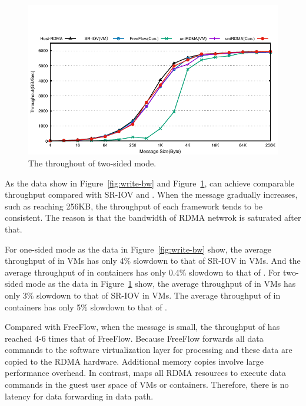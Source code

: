 \begin{figure}[!ht]
	\centering
	\includegraphics[width=1.00\linewidth]{images/send-bw.pdf}
	\caption{The throughout of two-sided mode.}
	\label{fig:send-bw}
\end{figure}


As the data show in Figure~\ref{fig:write-bw} and Figure~\ref{fig:send-bw}, \sys can achieve comparable throughput compared with SR-IOV and \native. When the message gradually increases, such as reaching 256KB, the throughput of each framework tends to be consistent. The reason is that the bandwidth of RDMA netwrok is saturated after that. %

For one-sided mode as the data in Figure~\ref{fig:write-bw} show, the average throughput of \sys in VMs has only 4$\%$ slowdown to that of SR-IOV in VMs. And the average throughput of \sys in containers has only 0.4$\%$ slowdown to that of \native. For two-sided mode as the data in Figure~\ref{fig:send-bw} show, the average throughput of \sys in VMs has only 3$\%$ slowdown to that of SR-IOV in VMs. The average throughput of \sys in containers has only 5$\%$ slowdown to that of \native.




Compared with FreeFlow, when the message is small, the throughput of \sys has reached 4-6 times that of FreeFlow. Because FreeFlow forwards all data commands to the software virtualization layer for processing and these data are copied to the RDMA hardware. Additional memory copies involve large performance overhead. In contrast, \sys maps all RDMA resources to execute data commands in the guest user space of VMs or containers. Therefore, there is no latency for data forwarding in data path.





